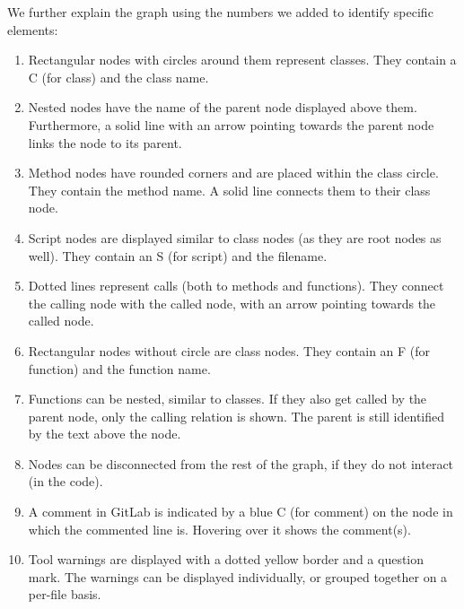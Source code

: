 \documentclass[a4paper,11pt,twoside]{article}
\theoremstyle{definition} %
\begin{document}
We further explain the graph using the numbers we added to identify specific elements:
 \begin{enumerate}
     \item Rectangular nodes with circles around them represent classes. They contain a C (for class) and the class name.
     \item Nested nodes have the name of the parent node displayed above them. Furthermore, a solid line with an arrow pointing towards the parent node links the node to its parent.
     \item Method nodes have rounded corners and are placed within the class circle. They contain the method name. A solid line connects them to their class node.
     \item Script nodes are displayed similar to class nodes (as they are root nodes as well). They contain an S (for script) and the filename.
     \item Dotted lines represent calls (both to methods and functions). They connect the calling node with the called node, with an arrow pointing towards the called node.
     \item Rectangular nodes without circle are class nodes. They contain an F (for function) and the function name.
     \item Functions can be nested, similar to classes. If they also get called by the parent node, only the calling relation is shown. The parent is still identified by the text above the node.
     \item Nodes can be disconnected from the rest of the graph, if they do not interact (in the code).
     \item A comment in GitLab is indicated by a blue C (for comment) on the node in which the commented line is. Hovering over it shows the comment(s).
     \item Tool warnings are displayed with a dotted yellow border and a question mark. The warnings can be displayed individually, or grouped together on a per-file basis.
 \end{enumerate}
\end{document}
